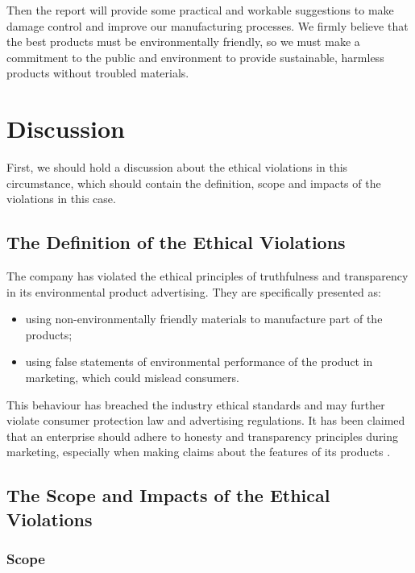 \documentclass[12pt]{article}
\begin{document}
Then the report will provide some practical and workable suggestions to make damage control and improve our manufacturing processes. We firmly believe that the best products must be environmentally friendly, so we must make a commitment to the public and environment to provide sustainable, harmless products without troubled materials.

\section{Discussion}

First, we should hold a discussion about the ethical violations in this circumstance, which should contain the definition, scope and impacts of the violations in this case.

\subsection{The Definition of the Ethical Violations}

The company has violated the ethical principles of truthfulness and transparency in its environmental product advertising. They are specifically presented as:

\begin{itemize}
  \item using non-environmentally friendly materials to manufacture part of the products;
  \item using false statements of environmental performance of the product in marketing, which could mislead consumers.
\end{itemize}

This behaviour has breached the industry ethical standards and may further violate consumer protection law and advertising regulations. It has been claimed that an enterprise should adhere to honesty and transparency principles during marketing, especially when making claims about the features of its products \citep{steiner2014business}.

\subsection{The Scope and Impacts of the Ethical Violations}

\subsubsection{Scope}
\end{document}
